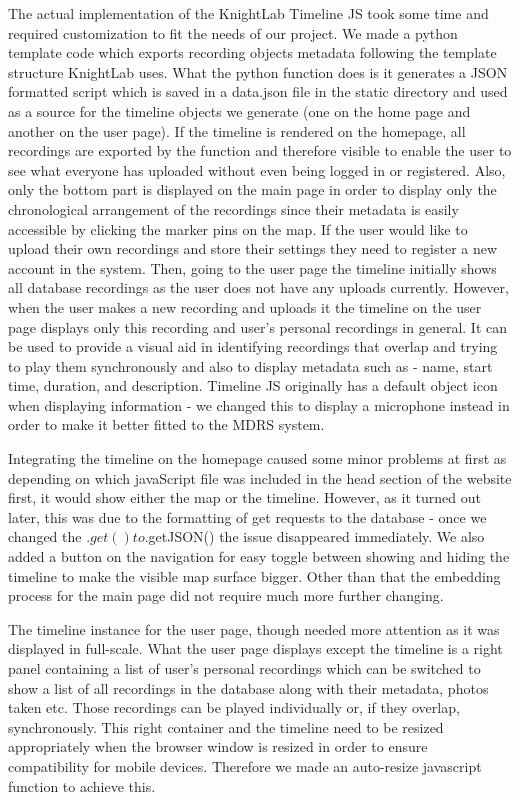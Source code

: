 \documentclass{l3proj}
\begin{document}
The actual implementation of the KnightLab Timeline JS took some time and required customization to fit the needs of our project. We made a python template code which exports recording objects metadata following the template structure KnightLab uses. What the python function does is it generates a JSON formatted script which is saved in a data.json file in the static directory and used as a source for the timeline objects we generate (one on the home page and another on the user page). If the timeline is rendered on the homepage, all recordings are exported by the function and therefore visible to enable the user to see what everyone has uploaded without even being logged in or registered. Also, only the bottom part is displayed on the main page in order to display only the chronological arrangement of the recordings since their metadata is easily accessible by clicking the marker pins on the map. If the user would like to upload their own recordings and store their settings they need to register a new account in the system. Then, going to the user page the timeline initially shows all database recordings as the user does not have any uploads currently. However, when the user makes a new recording and uploads it the timeline on the user page displays only this recording and user's personal recordings in general. It can be used to provide a visual aid in identifying recordings that overlap and trying to play them synchronously and also to display metadata such as - name, start time, duration, and description. Timeline JS originally has a default object icon when displaying information - we changed this to display a microphone instead in order to make it better fitted to the MDRS system.

Integrating the timeline on the homepage caused some minor problems at first as depending on which javaScript file was included in the head section of the website first, it would show either the map or the timeline. However, as it turned out later, this was due to the formatting of get requests to the database - once we changed the $.get() to $.getJSON() the issue disappeared immediately. We also added a button on the navigation for easy toggle between showing and hiding the timeline to make the visible map surface bigger. Other than that the embedding process for the main page did not require much more further changing.

The timeline instance for the user page, though needed more attention as it was displayed in full-scale. What the user page displays except the timeline is a right panel containing a list of user's personal recordings which can be switched to show a list of all recordings in the database along with their metadata, photos taken etc. Those recordings can be played individually or, if they overlap, synchronously. This right container and the timeline need to be resized appropriately when the browser window is resized in order to ensure compatibility for mobile devices. Therefore we made an auto-resize javascript function to achieve this.
\end{document}
